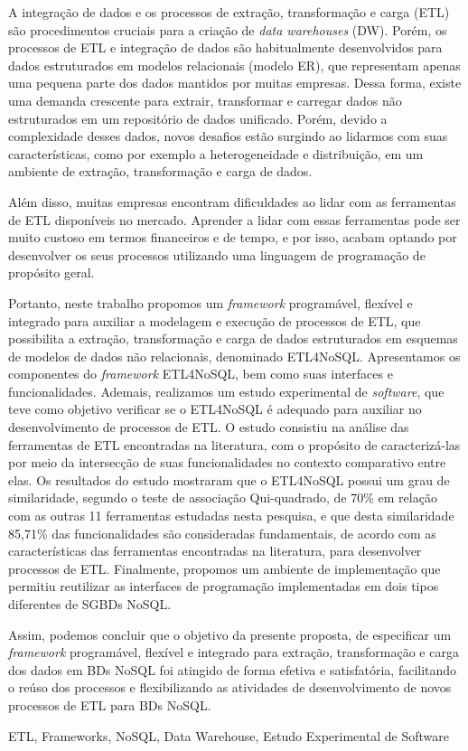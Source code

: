 
A integração de dados e os processos de extração, transformação e carga (ETL) são procedimentos cruciais para a criação de \textit{data warehouses} (DW). Porém, os processos de ETL e integração de dados são habitualmente desenvolvidos para dados estruturados em modelos relacionais (modelo ER), que representam apenas uma pequena parte dos dados mantidos por muitas empresas. Dessa forma, existe uma demanda crescente para extrair, transformar e carregar dados não estruturados em um repositório de dados unificado. Porém, devido a complexidade desses dados, novos desafios estão surgindo ao lidarmos com suas características, como por exemplo a heterogeneidade e distribuição, em um ambiente de extração, transformação e carga de dados.

Além disso, muitas empresas encontram dificuldades ao lidar com as ferramentas de ETL disponíveis no mercado. Aprender a lidar com essas ferramentas pode ser muito custoso em termos financeiros e de tempo, e por isso, acabam optando por desenvolver os seus processos utilizando uma linguagem de programação de propósito geral.

Portanto, neste trabalho propomos um \textit{framework} programável, flexível e integrado para auxiliar a modelagem e execução de processos de ETL, que possibilita a extração, transformação e carga de dados estruturados em esquemas de modelos de dados não relacionais, denominado ETL4NoSQL. Apresentamos os componentes do \textit{framework} ETL4NoSQL, bem como suas interfaces e funcionalidades. Ademais, realizamos um estudo experimental de \textit{software}, que teve como objetivo verificar se o ETL4NoSQL é adequado para auxiliar no desenvolvimento de processos de ETL. O estudo consistiu na análise das ferramentas de ETL encontradas na literatura, com o propósito de caracterizá-las por meio da intersecção de suas funcionalidades no contexto comparativo entre elas. Os resultados do estudo mostraram que o ETL4NoSQL possui um grau de similaridade, segundo o teste de associação Qui-quadrado, de 70\% em relação com as outras 11 ferramentas estudadas nesta pesquisa, e que desta similaridade 85,71\% das funcionalidades são consideradas fundamentais, de acordo com as características das ferramentas encontradas na literatura, para desenvolver processos de ETL. Finalmente, propomos um ambiente de implementação que permitiu reutilizar as interfaces de programação implementadas em dois tipos diferentes de SGBDs NoSQL.

Assim, podemos concluir que o objetivo da presente proposta, de especificar um \textit{framework} programável, flexível e integrado para extração, transformação e carga dos dados em BDs NoSQL foi atingido de forma efetiva e satisfatória, facilitando o reúso dos processos e flexibilizando as atividades de desenvolvimento de novos processos de ETL para BDs NoSQL.

\begin{keywords}
ETL, Frameworks, NoSQL, Data Warehouse, Estudo Experimental de Software
\end{keywords}